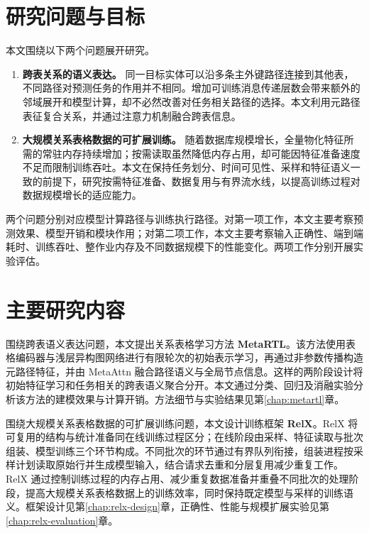 \section{研究问题与目标}

本文围绕以下两个问题展开研究。

\begin{enumerate}
  \item \textbf{跨表关系的语义表达。} 同一目标实体可以沿多条主外键路径连接到其他表，不同路径对预测任务的作用并不相同。增加可训练消息传递层数会带来额外的邻域展开和模型计算，却不必然改善对任务相关路径的选择。本文利用元路径表征复合关系，并通过注意力机制融合跨表信息。

  \item \textbf{大规模关系表格数据的可扩展训练。} 随着数据库规模增长，全量物化特征所需的常驻内存持续增加；按需读取虽然降低内存占用，却可能因特征准备速度不足而限制训练吞吐。本文在保持任务划分、时间可见性、采样和特征语义一致的前提下，研究按需特征准备、数据复用与有界流水线，以提高训练过程对数据规模增长的适应能力。
\end{enumerate}

两个问题分别对应模型计算路径与训练执行路径。对第一项工作，本文主要考察预测效果、模型开销和模块作用；对第二项工作，本文主要考察输入正确性、端到端耗时、训练吞吐、整作业内存及不同数据规模下的性能变化。两项工作分别开展实验评估。

\section{主要研究内容}

围绕跨表语义表达问题，本文提出关系表格学习方法 \textbf{MetaRTL}。该方法使用表格编码器与浅层异构图网络进行有限轮次的初始表示学习，再通过非参数传播构造元路径特征，并由 MetaAttn 融合路径语义与全局节点信息。这样的两阶段设计将初始特征学习和任务相关的跨表语义聚合分开。本文通过分类、回归及消融实验分析该方法的建模效果与计算开销。方法细节与实验结果见第\ref{chap:metartl}章。

围绕大规模关系表格数据的可扩展训练问题，本文设计训练框架 \textbf{RelX}。RelX 将可复用的结构与统计准备同在线训练过程区分；在线阶段由采样、特征读取与批次组装、模型训练三个环节构成。不同批次的环节通过有界队列衔接，组装进程按采样计划读取原始行并生成模型输入，结合请求去重和分层复用减少重复工作。RelX 通过控制训练过程的内存占用、减少重复数据准备并重叠不同批次的处理阶段，提高大规模关系表格数据上的训练效率，同时保持既定模型与采样的训练语义。框架设计见第\ref{chap:relx-design}章，正确性、性能与规模扩展实验见第\ref{chap:relx-evaluation}章。

